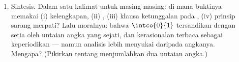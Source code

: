\begin{problem}
\begin{enumerate}[resume]
        --- yaitu alasan mengapa $0.1 + 0.2$ pada titik mengambang sebuah komputer
        tidak persis $0.3$.
  \item Sintesis. Dalam satu kalimat untuk masing-masing: di mana buktinya memakai
        (i) kelengkapan, (ii) , (iii)
        klausa ketunggalan pada , (iv) prinsip sarang
        merpati? Lalu moralnya: bahwa $\intco{0}{1}$ tersandikan dengan setia
        oleh untaian angka yang sejati, dan kerasionalan terbaca sebagai
        keperiodikan --- namun analisis lebih menyukai  daripada
        angkanya. Mengapa? (Pikirkan tentang menjumlahkan dua untaian angka.)

\end{enumerate}
\end{problem}
